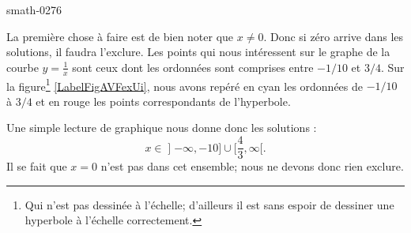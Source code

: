 
\begin{corrige}{smath-0276}

    La première chose à faire est de bien noter que \( x\neq 0\). Donc si zéro arrive dans les solutions, il faudra l'exclure. Les points qui nous intéressent sur le graphe de la courbe \( y=\frac{1}{ x }\) sont ceux dont les ordonnées sont comprises entre \( -1/10\) et \( 3/4\). Sur la figure\footnote{Qui n'est pas dessinée à l'échelle; d'ailleurs il est sans espoir de dessiner une hyperbole à l'échelle correctement.} \ref{LabelFigAVFexUi}, nous avons repéré en cyan les ordonnées de \( -1/10\) à $3/4$ et en rouge les points correspondants de l'hyperbole.

\newcommand{\CaptionFigAVFexUi}{Résolution de l'exercice \ref{exosmath-0276}.}


Une simple lecture de graphique nous donne donc les solutions :
\begin{equation}
    x\in\mathopen] -\infty , -10 \mathclose]\cup \mathopen[ \frac{ 4 }{ 3 } , \infty [.
\end{equation}
Il se fait que \( x=0\) n'est pas dans cet ensemble; nous ne devons donc rien exclure.

\end{corrige}

